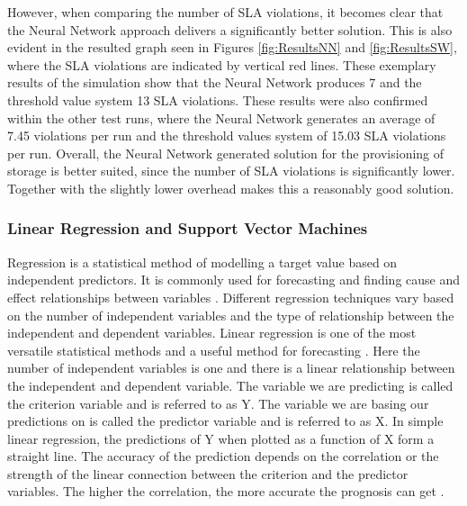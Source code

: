 However, when comparing the number of SLA violations, it becomes clear that the Neural Network approach delivers a significantly better solution. This is also evident in the resulted graph seen in Figures \ref{fig:ResultsNN} and \ref{fig:ResultsSW}, where the SLA violations are indicated by vertical red lines. These exemplary results of the simulation show that the Neural Network produces 7 and the threshold value system 13 SLA violations. These results were also confirmed within the other test runs, where the Neural Network generates an average of 7.45 violations per run and the threshold values system of 15.03 SLA violations per run. Overall, the Neural Network generated solution for the provisioning of storage is better suited, since the number of SLA violations is significantly lower. Together with the slightly lower overhead makes this a reasonably good solution.



\subsubsection{Linear Regression and Support Vector Machines}\label{SVM}
Regression is a statistical method of modelling a target value based on independent predictors. It is commonly used for forecasting and finding cause and effect relationships between variables  \cite{datascience2017}. Different regression techniques vary based on the number of independent variables and the type of relationship between the independent and dependent variables. Linear regression is one of the most versatile statistical methods and a useful method for forecasting  \cite{weisberg2014applied}. Here the number of independent variables is one and there is a linear relationship between the independent and dependent variable. The variable we are predicting is called the criterion variable and is referred to as Y. The variable we are basing our predictions on is called the predictor variable and is referred to as X. In simple linear regression, the predictions of Y when plotted as a function of X form a straight line. The accuracy of the prediction depends on the correlation or the strength of the linear connection between the criterion and the predictor variables. The higher the correlation, the more accurate the prognosis can get  \cite{montgomery2013introduction}.

